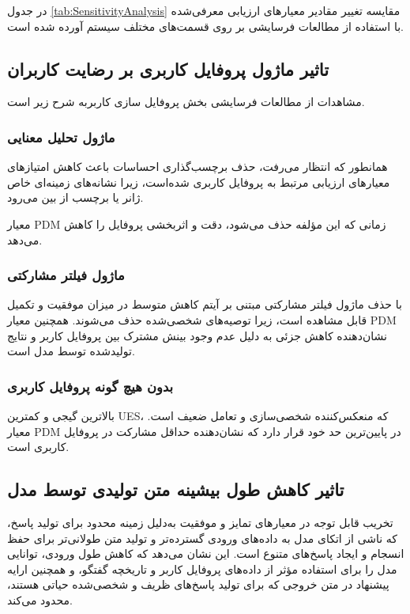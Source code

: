 در جدول 
\ref{tab:SensitivityAnalysis}
مقایسه تغییر مقادیر معیارهای ارزیابی معرفی‌شده با استفاده از مطالعات فرسایشی بر روی قسمت‌های مختلف سیستم آورده شده است.






\subsection{تاثیر ماژول پروفایل کاربری بر رضایت کاربران}
مشاهدات از مطالعات فرسایشی بخش پروفایل سازی کاربربه شرح زیر است.

\subsubsection{ماژول تحلیل معنایی}

همانطور که انتظار می‌رفت، حذف برچسب‌گذاری احساسات باعث کاهش امتیازهای معیارهای ارزیابی مرتبط به پروفایل کاربری شده‌است، زیرا نشانه‌های زمینه‌ای خاص ژانر یا برچسب از بین می‌رود.

معیار PDM زمانی که این مؤلفه حذف می‌شود، دقت و اثربخشی پروفایل را کاهش می‌دهد. 

\subsubsection{ماژول فیلتر مشارکتی}

با حذف ماژول فیلتر مشارکتی مبتنی بر آیتم کاهش متوسط ​​در میزان موفقیت و تکمیل قابل مشاهده است، زیرا توصیه‌های شخصی‌شده حذف می‌شوند.
همچنین معیار PDM نشان‌دهنده کاهش جزئی به دلیل عدم وجود بینش مشترک بین پروفایل کاربر و نتایج تولیدشده توسط مدل است.

\subsubsection{بدون هیچ‌ گونه پروفایل کاربری}

بالاترین گیجی و کمترین UES، که منعکس‌کننده شخصی‌سازی و تعامل ضعیف است. معیار PDM در پایین‌ترین حد خود قرار دارد که نشان‌دهنده حداقل مشارکت در پروفایل کاربری است.

\subsection{تاثیر کاهش طول بیشینه متن تولیدی توسط مدل}

تخریب قابل توجه در معیارهای تمایز و موفقیت به‌دلیل زمینه محدود برای تولید پاسخ، که ناشی از اتکای مدل به داده‌های ورودی گسترده‌تر و تولید متن طولانی‌تر برای حفظ انسجام و ایجاد پاسخ‌های متنوع است. این نشان می‌دهد که کاهش طول ورودی، توانایی مدل را برای استفاده مؤثر از داده‌های پروفایل کاربر و تاریخچه گفتگو، و همچنین ارایه پیشنهاد در متن خروجی که برای تولید پاسخ‌های ظریف و شخصی‌شده حیاتی هستند، محدود می‌کند.


